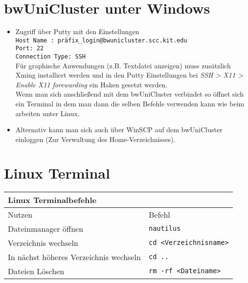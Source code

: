 \documentclass[12pt]{scrartcl}%
\theoremstyle{nonumberplain}
\begin{document}
\section{bwUniCluster unter Windows}
\begin{itemize}
\item Zugriff über Putty mit den Einstellungen\\
\hspace*{0.5cm}\texttt{Host Name : präfix\_login@bwunicluster.scc.kit.edu}\\
\hspace*{0.5cm}\texttt{Port: 22}\\ 
\hspace*{0.5cm}\texttt{Connection Type: SSH} \\ 
Für graphische Anwendungen (z.B. Textdatei anzeigen) muss zusätzlich Xming installiert werden und in den Putty Einstellungen bei \textit{SSH > X11 > Enable X11 forewarding} ein Haken gesetzt werden.\\
Wenn man sich anschließend mit dem bwUniCluster verbindet so öffnet sich ein Terminal in dem man dann die selben Befehle verwenden kann wie beim arbeiten unter Linux.
\item Alternativ kann man sich auch über WinSCP auf dem bwUniCluster einloggen (Zur Verwaltung des Home-Verzeichnisses).
\end{itemize}

\section{Linux Terminal}
\begin{tabular}{ll} 
\toprule
\textbf{Linux Terminalbefehle}\\  
\midrule 
Nutzen & Befehl\\ 
\midrule 
Dateinmanager öffnen & \texttt{nautilus}\\
Verzeichnis wechseln & \texttt{cd <Verzeichnisname>}\\
In nächst höheres Verzeichnis wechseln & \texttt{cd ..}\\
Dateien Löschen & \texttt{rm -rf <Dateiname>} \\
\bottomrule
\end{tabular}
\end{document}
